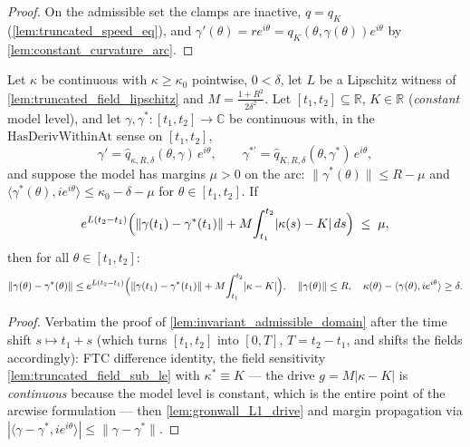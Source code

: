 \begin{proof}

\leanok
  On the admissible set the clamps are inactive, $\hat q=q_K$
  (\cref{lem:truncated_speed_eq}), and $\gamma'(\theta)=re^{i\theta}
  =q_K(\theta,\gamma(\theta))e^{i\theta}$ by \cref{lem:constant_curvature_arc}.
\end{proof}

\begin{lemma}
  \label{lem:invariant_admissible_arc}
  Let $\kappa$ be continuous with $\kappa\ge\kappa_0$ pointwise, $0<\delta$, let $L$ be a
  Lipschitz witness of \cref{lem:truncated_field_lipschitz} and
  $M=\tfrac{1+R^2}{2\delta^2}$. Let $[t_1,t_2]\subseteq\mathbb R$, $K\in\mathbb R$
  (\emph{constant} model level), and let $\gamma,\gamma^\ast:[t_1,t_2]\to\mathbb C$ be continuous
  with, in the $\mathrm{HasDerivWithinAt}$ sense on $[t_1,t_2]$,
  \[
    \gamma'=\hat q_{\kappa,R,\delta}(\theta,\gamma)\,e^{i\theta},\qquad
    \gamma^{\ast\prime}=\hat q_{K,R,\delta}(\theta,\gamma^\ast)\,e^{i\theta},
  \]
  and suppose the model has margins $\mu>0$ on the arc:
  $\|\gamma^\ast(\theta)\|\le R-\mu$ and
  $\langle \gamma^\ast(\theta),ie^{i\theta}\rangle\le\kappa_0-\delta-\mu$ for
  $\theta\in[t_1,t_2]$. If
  \[
    e^{L(t_2-t_1)}\Bigl(\|\gamma(t_1)-\gamma^\ast(t_1)\|
      +M\!\int_{t_1}^{t_2}\!|\kappa(s)-K|\,ds\Bigr)\;\le\;\mu,
  \]
  then for all $\theta\in[t_1,t_2]$:
  \[
    \|\gamma(\theta)-\gamma^\ast(\theta)\|\le
    e^{L(t_2-t_1)}\Bigl(\|\gamma(t_1)-\gamma^\ast(t_1)\|+M\!\int_{t_1}^{t_2}\!|\kappa-K|\Bigr),
    \quad
    \|\gamma(\theta)\|\le R,\quad
    \kappa(\theta)-\langle \gamma(\theta),ie^{i\theta}\rangle\ge\delta .
  \]
\end{lemma}

\begin{proof}

\leanok
  Verbatim the proof of \cref{lem:invariant_admissible_domain} after the time shift
  $s\mapsto t_1+s$ (which turns $[t_1,t_2]$ into $[0,T]$, $T=t_2-t_1$, and shifts the
  fields accordingly): FTC difference identity, the field sensitivity
  \cref{lem:truncated_field_sub_le} with $\kappa^\ast\equiv K$ — the drive
  $g=M|\kappa-K|$ is \emph{continuous} because the model level is constant, which is the
  entire point of the arcwise formulation — then \cref{lem:gronwall_L1_drive} and margin
  propagation via $|\langle \gamma-\gamma^\ast,ie^{i\theta}\rangle|\le\|\gamma-\gamma^\ast\|$.
\end{proof}

